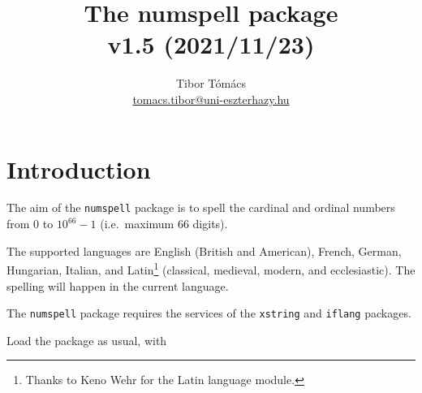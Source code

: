 \documentclass{article}
\newcommand{\commandinline}{\lstinline[
literate={<}{{$\langle$}}1{>}{{$\rangle$}}1,
delim={[is][\color{green!50!black}\normalfont\itshape]{!}{!}},
basicstyle=\color{blue!80!black}\ttfamily,
columns=fullflexible,
keepspaces]}
\begin{document}
\title{The {\bfseries\sffamily numspell} package\\{\large v1.5 (2021/11/23)}}
\author{Tibor Tómács\\{\normalsize\url{tomacs.tibor@uni-eszterhazy.hu}}}
\date{}
\maketitle

\section{Introduction}
The aim of the \texttt{numspell} package is to spell the cardinal and ordinal numbers from 0 to $10^{66}-1$ (i.e.~maximum 66 digits).

The supported languages are English (British and American), French, German, Hungarian, Italian, and Latin\footnote{Thanks to Keno Wehr for the Latin language module.} (classical, medieval, modern, and ecclesiastic).
The spelling will happen in the current language.

The \texttt{numspell} package requires the services of the \texttt{xstring} and \texttt{iflang} packages.

Load the package as usual, with
\begin{flushleft}
\commandinline|\usepackage{numspell}|
\end{flushleft}
\end{document}
